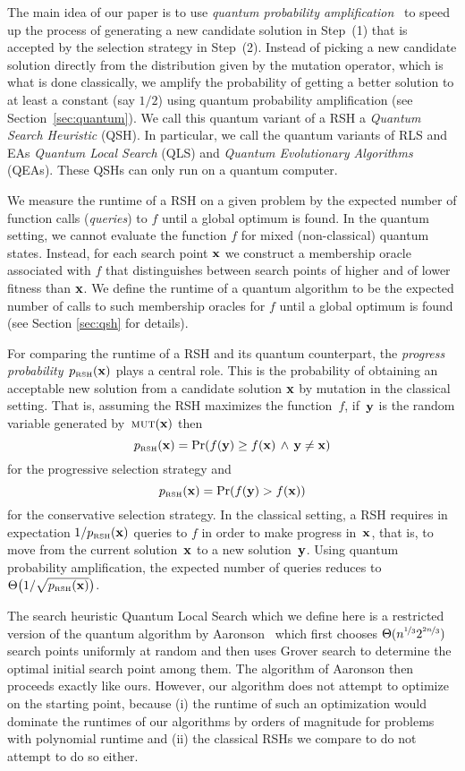 \documentclass[a4paper,11pt]{article}
\begin{document}
The main idea of our paper is to use \emph{quantum probability
  amplification}~\cite{brassard98quantum} to speed up the process of
generating a new candidate solution in Step~(1) that is accepted by
the selection strategy in Step~(2). Instead of picking a new candidate
solution directly from the distribution given by the mutation
operator, which is what is done classically, we amplify the
probability of getting a better solution to at least a constant (say
$1/2$) using quantum probability amplification (see
Section~\ref{sec:quantum}). We call this quantum variant of a RSH a
\emph{Quantum Search Heuristic} (QSH). In particular, we call the
quantum variants of RLS and EAs \emph{Quantum Local Search} (QLS) and
\emph{Quantum Evolutionary Algorithms} (QEAs). These QSHs can only run
on a quantum computer.

We measure the runtime of a RSH on a given problem by the expected number of function calls (\emph{queries}) to $f$ until a global optimum is found. In the quantum setting, we cannot evaluate the function $f$ for mixed (non-classical) quantum states. Instead, for each search point $\xvec$ we construct a membership oracle associated with $f$ that distinguishes between search points of higher and of lower fitness than $\xvec$. We define the runtime of a quantum algorithm to be the expected number of calls to such membership oracles for $f$ until a global optimum is found (see Section \ref{sec:qsh} for details).

For comparing the runtime of a RSH and its quantum counterpart, the \emph{progress probability}~$p_\RSH(\xvec)$ plays a central role. This is the probability of obtaining an acceptable new solution from a candidate solution $\xvec$ by mutation in the classical setting. That is, assuming the RSH maximizes the function~$f$, if~$\yvec$ is the random variable generated by~$\mut(\xvec)$ then
\[
p_\RSH(\xvec) = \Pr(f(\yvec)\ge f(\xvec)\,\wedge\,\yvec\neq \xvec)
\]
for the progressive selection strategy and
\[
p_\RSH(\xvec) = \Pr(f(\yvec)> f(\xvec))
\]
for the conservative selection strategy. In the classical setting, a RSH requires in expectation $1/p_\RSH(\xvec)$ queries to $f$ in order to make progress in~$\xvec$, that is, to move from the current solution~$\xvec$ to a new solution~$\yvec$. Using quantum probability amplification, the expected number of queries reduces to $\Theta\big(1/\sqrt{p_\RSH(\xvec)}\big)$. 

The search heuristic Quantum Local Search which we define here is a restricted version of the quantum algorithm by Aaronson~\cite{Aaronson06} which first chooses $\Theta(n^{\nicefrac{1}{3}}2^{\nicefrac{2n}{3}})$ search points uniformly at random and then uses Grover search to determine the optimal initial search point among them. The algorithm of Aaronson then proceeds exactly like ours. However, our algorithm does not attempt to optimize on the starting point, because (i) the runtime of such an optimization would dominate the runtimes of our algorithms by orders of magnitude for problems with polynomial runtime and (ii) the classical RSHs we compare to do not attempt to do so either.
\end{document}
